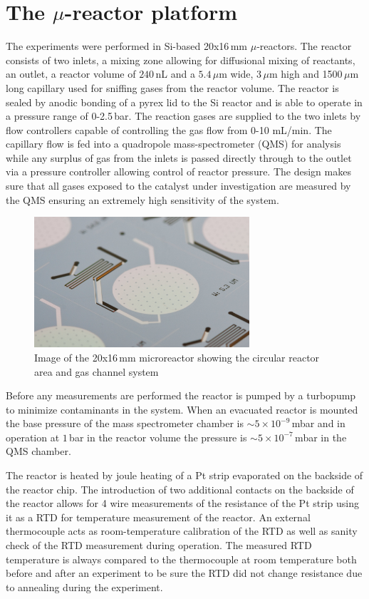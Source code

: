 \documentclass[8.5pt,twoside,twocolumn]{article}
\begin{document}
\section{The $\mu$-reactor platform}
The experiments were performed in Si-based 20x16\,mm $\mu$-reactors\cite{Henriksen2009}. The reactor consists of two inlets, a mixing zone allowing for diffusional mixing of reactants, an outlet, a reactor volume of $240\,$nL and a $5.4\,\mu$m wide, 3\,$\mu$m high and 1500\,$\mu$m long capillary used for sniffing gases from the reactor volume. The reactor is sealed by anodic bonding of a pyrex lid to the Si reactor and is able to operate in a pressure range of 0-2.5\,bar. The reaction gases are supplied to the two inlets by flow controllers capable of controlling the gas flow from 0-10 mL/min. The capillary flow is fed into a quadropole mass-spectrometer (QMS) for analysis while any surplus of gas from the inlets is passed directly through to the outlet via a pressure controller allowing control of reactor pressure. The design makes sure that all gases exposed to the catalyst under investigation are measured by the QMS ensuring an extremely high sensitivity of the system. 

\begin{figure}[h]
  \centering
  \includegraphics[width=8cm]{reactor.jpg}
  \caption{Image of the 20x16\,mm microreactor showing the circular reactor area and gas channel system}
  \label{fgr:reactor}
\end{figure}


Before any measurements are performed the reactor is pumped by a turbopump to minimize contaminants in the system. When an evacuated reactor is mounted the base pressure of the mass spectrometer chamber is $\sim5\times10^{-9}\,$mbar and in operation at $1\,$bar in the reactor volume the pressure is $\sim5\times10^{-7}\,$mbar in the QMS chamber. 

The reactor is heated by joule heating of a Pt strip evaporated on the backside of the reactor chip. The introduction of two additional contacts on the backside of the reactor allows for 4 wire measurements of the resistance of the Pt strip using it as a RTD for temperature measurement of the reactor. An external thermocouple acts as room-temperature calibration of the RTD as well as sanity check of the RTD measurement during operation. The measured RTD temperature is always compared to the thermocouple at room temperature both before and after an experiment to be sure the RTD did not change resistance due to annealing during the experiment.
\end{document}
